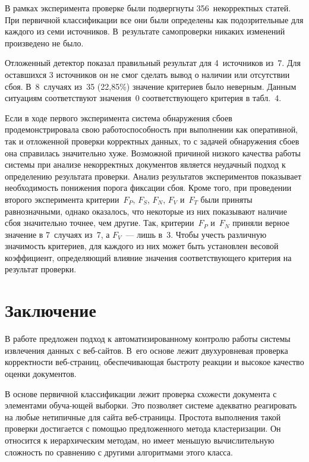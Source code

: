 \begin{multicols}{2}
  В рамках эксперимента проверке были подвергнуты 356~некорректных 
статей. При первичной классификации все они были определены как 
подозрительные для каждого из семи источников. В~результате самопроверки 
никаких изменений произведено не было. 
  
  Отложенный детектор показал правильный результат для 4~источников из~7. 
Для оставшихся 3 источников он не смог сделать вывод о наличии или 
отсутствии сбоя. В~8~случаях из~35 (22,85\%) значение критериев было 
неверным. Данным ситуациям соответствуют значения~0 соответствующего 
критерия в табл.~4.
  
  Если в ходе первого эксперимента система обнаружения сбоев 
продемонстрировала свою работоспособность при выполнении как 
оперативной, так и отложенной проверки корректных данных, то с задачей 
обнаружения сбоев она справилась значительно хуже. Возможной причиной 
низкого качества работы системы при анализе некорректных документов 
является неудачный подход к определению результата проверки. Анализ 
результатов экспериментов показывает необходимость понижения порога 
фиксации сбоя. Кроме того, при проведении второго эксперимента 
критерии~$F_P$, $F_S$, $F_N$, $F_V$ и~$F_T$ были приняты равнозначными, 
однако оказалось, что некоторые из них показывают наличие сбоя значительно 
точнее, чем другие. Так, критерии~$F_P$ и~$F_N$ приняли верное значение в 
7~случаях из~7, а $F_V$~--- лишь в~3. Чтобы учесть различную значимость 
критериев, для каждого из них может быть установлен весовой коэффициент, 
определяющий влияние значения соответствующего критерия на результат 
проверки.





\vspace*{-6pt}

\section{Заключение}

\vspace*{-2pt}

    В работе предложен подход к автоматизированному контролю работы 
системы извлечения данных с веб-сай\-тов. В~его основе лежит двухуровневая 
проверка корректности веб-стра\-ниц, обеспе\-чи\-ва\-ющая быстроту реакции и 
высокое качество оценки документов.
  
    В основе первичной классификации лежит проверка схожести документа с 
элементами обуча-\linebreak ющей выборки. Это позволяет системе адекватно реа\-ги\-ровать 
на любые нетипичные для сайта веб-стра\-ни\-цы. Простота выполнения такой 
проверки достигается с помощью предложенного метода клас\-те\-ри\-за\-ции. Он 
относится к иерархическим методам, но имеет меньшую вычислительную 
сложность по сравнению с другими алгоритмами этого класса.
  

\end{multicols}
